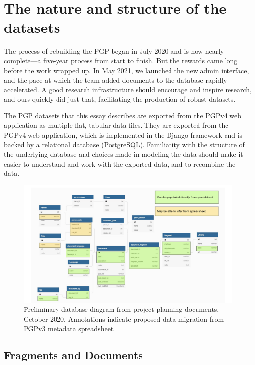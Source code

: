 \documentclass{article}
\begin{document}
\section{The nature and structure of the datasets}

The process of rebuilding the PGP began in July 2020 and is now nearly complete—a five-year process from start to finish. But the rewards came long before the work wrapped up. In May 2021, we launched the new admin interface, and the pace at which the team added documents to the database rapidly accelerated. A good research infrastructure should encourage and inspire research, and ours quickly did just that, facilitating the production of robust datasets. 

The PGP datasets that this essay describes are exported from the PGPv4 web application as multiple flat, tabular data files. They are exported from the PGPv4 web application, which is implemented in the Django framework and is backed by a relational database (PostgreSQL). Familiarity with the structure of the underlying database and choices made in modeling the data should make it easier to understand and work with the exported data, and to recombine the data. 

\begin{figure}[!ht]
  \includegraphics[width=\textwidth]{db-diagrams/pgpv4_dbdiagram_import.pdf}
  \centering
  \caption{Preliminary database diagram from project planning documents, October 2020. Annotations indicate proposed data migration from PGPv3 metadata spreadsheet.}
  \label{fig:pgpv4_dbdiagram}
\end{figure}


\subsection{Fragments and Documents}
\end{document}
